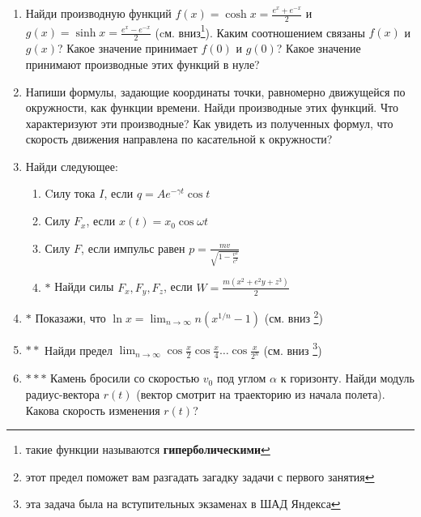 \begin{enumerate}
    \item Найди производную функций $f(x) = \cosh x = \frac{e^x + e^{-x}}{2}$ и $g(x) = \sinh x = \frac{e^x - e^{-x}}{2}$ (cм. вниз\footnote{такие функции называются \textbf{гиперболическими}}). Каким соотношением связаны $f(x)$ и $g(x)$? Какое значение принимает $f(0)$ и $g(0)$? Какое значение принимают производные этих функций в нуле?
    \item Напиши формулы, задающие координаты точки, равномерно движущейся по окружности, как функции времени. Найди производные этих функций. Что характеризуют эти производные? Как увидеть из полученных формул, что скорость движения направлена по касательной к окружности?
    \item Найди следующее:
    \begin{enumerate}
        \item Cилу тока $I$, если $q = A e^{-\gamma t} \cos t$
        \item Силу $F_x$, если $x(t) = x_0 \cos \omega t$
        \item Силу $F$, если импульс равен $p = \frac{mv}{\sqrt{1 - \frac{v^2}{c^2}}}$
        \item $\boldsymbol{*}$ Найди силы $F_x, F_y, F_z$, если $W = \frac{m(x^2 + e^2y + z^3)}{2}$
    \end{enumerate}
    \item $\boldsymbol{*}$ Показажи, что $\displaystyle \ln x = \lim_{n \rightarrow \infty} n (x^{1/n} - 1)$ (см. вниз \footnote{этот предел поможет вам разгадать загадку задачи с первого занятия})
    \item $\boldsymbol{**}$ Найди предел $\displaystyle \lim_{n \rightarrow \infty} \cos \frac{x}{2} \cos \frac{x}{4} \dots \cos \frac{x}{2^n}$ (см. вниз \footnote{эта задача была на вступительных экзаменах в ШАД Яндекса})
    \item $\boldsymbol{***}$ Камень бросили со скоростью $v_0$ под углом $\alpha$ к горизонту. Найди модуль радиус-вектора $r(t)$ (вектор смотрит на траекторию из начала полета). Какова скорость изменения $r(t)$?
\end{enumerate}